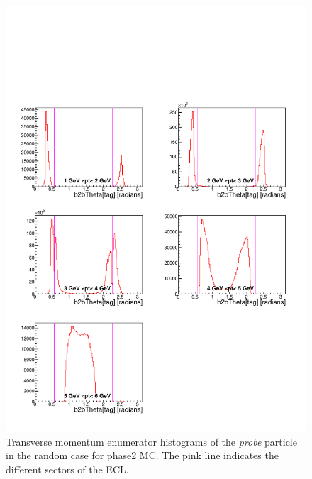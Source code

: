 \documentclass[a4paper,11pt,twosided,final,german,openbib,pdftex,listof=totoc,bibliography=totoc]{scrbook}
\begin{document}
\begin{appendix}
\begin{figure}[!htbp]
	\centering
	\includegraphics[width=\textwidth]{Plots/master/xPtMThetaRandomE_MC}
	\caption[Transverse Momentum $\theta$ Random Enumerator Histogram Phase2 MC]{Transverse momentum enumerator histograms of the \textit{probe} particle in the random case for phase2 MC. The pink line indicates the different sectors of the ECL.}
	\label{plt:PtMThetaRandomE_MC}
\end{figure}


\end{appendix}
\end{document}
